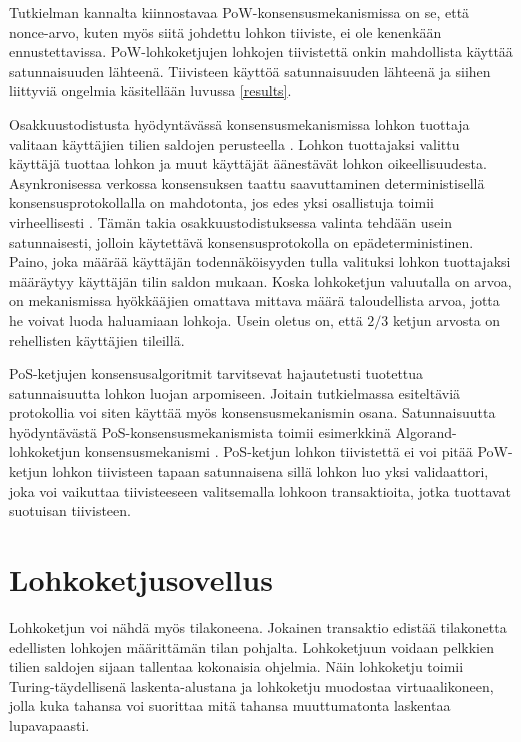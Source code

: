 Tutkielman kannalta kiinnostavaa PoW-konsensusmekanismissa on se, että nonce-arvo, kuten myös siitä johdettu lohkon tiiviste, ei ole kenenkään ennustettavissa. PoW-lohkoketjujen lohkojen tiivistettä onkin mahdollista käyttää satunnaisuuden lähteenä. Tiivisteen käyttöä satunnaisuuden lähteenä ja siihen liittyviä ongelmia käsitellään luvussa \ref{results}.


Osakkuustodistusta hyödyntävässä konsensusmekanismissa lohkon tuottaja valitaan käyttäjien tilien saldojen perusteella \cite{NguyenCongT2019PCMf}. Lohkon tuottajaksi valittu käyttäjä tuottaa lohkon ja muut käyttäjät äänestävät lohkon oikeellisuudesta. Asynkronisessa verkossa konsensuksen taattu saavuttaminen deterministisellä konsensusprotokollalla on mahdotonta, jos edes yksi osallistuja toimii virheellisesti \cite{fischer_impossibility_1985}. Tämän takia osakkuustodistuksessa valinta tehdään usein satunnaisesti, jolloin käytettävä konsensusprotokolla on epädeterministinen. Paino, joka määrää käyttäjän todennäköisyyden tulla valituksi lohkon tuottajaksi määräytyy käyttäjän tilin saldon mukaan. Koska lohkoketjun valuutalla on arvoa, on mekanismissa hyökkääjien omattava mittava määrä taloudellista arvoa, jotta he voivat luoda haluamiaan lohkoja. Usein oletus on, että $2/3$ ketjun arvosta on rehellisten käyttäjien tileillä. 

 PoS-ketjujen konsensusalgoritmit tarvitsevat hajautetusti tuotettua satunnaisuutta lohkon luojan arpomiseen. Joitain tutkielmassa esiteltäviä protokollia voi siten käyttää myös konsensusmekanismin osana. Satunnaisuutta hyödyntävästä PoS-konsensusmekanismista toimii esimerkkinä Algorand-lohkoketjun konsensusmekanismi \cite{gilad_algorand_2017}. PoS-ketjun lohkon tiivistettä ei voi pitää PoW-ketjun lohkon tiivisteen tapaan satunnaisena sillä lohkon luo yksi validaattori, joka voi vaikuttaa tiivisteeseen valitsemalla lohkoon transaktioita, jotka tuottavat suotuisan tiivisteen.

\section{Lohkoketjusovellus}

Lohkoketjun voi nähdä myös tilakoneena. Jokainen transaktio edistää tilakonetta edellisten lohkojen määrittämän tilan pohjalta. Lohkoketjuun voidaan pelkkien tilien saldojen sijaan tallentaa kokonaisia ohjelmia. Näin lohkoketju toimii Turing-täydellisenä laskenta-alustana ja lohkoketju muodostaa virtuaalikoneen, jolla kuka tahansa voi suorittaa mitä tahansa muuttumatonta laskentaa lupavapaasti.

